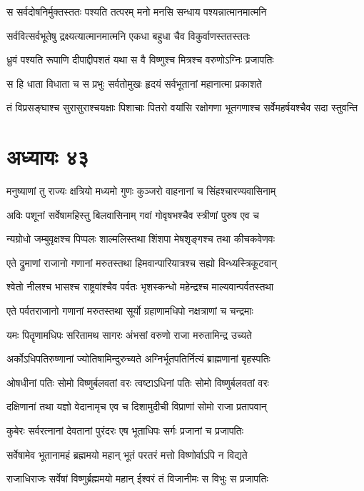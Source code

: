 \twolineshloka
{स सर्वदोषनिर्मुक्तस्ततः पश्यति तत्परम्}
{मनो मनसि सन्धाय पश्यन्नात्मानमात्मनि}


\twolineshloka
{सर्ववित्सर्वभूतेषु द्रक्ष्यत्यात्मानमात्मनि}
{एकधा बहुधा चैव विकुर्वाणस्ततस्ततः}


\twolineshloka
{ध्रुवं पश्यति रूपाणि दीपाद्दीपशतं यथा}
{स वै विष्णुश्च मित्रश्च वरुणोऽग्निः प्रजापतिः}


\twolineshloka
{स हि धाता विधाता च स प्रभुः सर्वतोमुखः}
{हृदयं सर्वभूतानां महानात्मा प्रकाशते}


\twolineshloka
{तं विप्रसङ्घाश्च सुरासुराश्चयक्षाः पिशाचाः पितरो वयांसि}
{रक्षोगणा भूतगणाश्च सर्वेमहर्षयश्चैव सदा स्तुवन्ति}


\chapter{अध्यायः ४३}
\twolineshloka
{मनुष्याणां तु राज्यः क्षत्रियो मध्यमो गुणः}
{कुञ्जरो वाहनानां च सिंहश्चारण्यवासिनाम्}


\twolineshloka
{अविः पशूनां सर्वेषामहिस्तु बिलवासिनाम्}
{गवां गोवृषभश्चैव स्त्रीणां पुरुष एव च}


\twolineshloka
{न्यग्रोधो जम्बुवृक्षश्च पिप्पलः शाल्मलिस्तथा}
{शिंशपा मेषशृङ्गश्च तथा कीचकवेणवः}


\twolineshloka
{एते द्रुमाणां राजानो गणानां मरुतस्तथा}
{हिमवान्पारियात्रश्च सह्यो विन्ध्यस्त्रिकूटवान्}


\twolineshloka
{श्वेतो नीलश्च भासश्च राष्ट्रवांश्चैव पर्वतः}
{भृशस्कन्धो महेन्द्रश्च माल्यवान्पर्वतस्तथा}


\twolineshloka
{एते पर्वतराजानो गणानां मरुतस्तथा}
{सूर्यो ग्रहाणामधिपो नक्षत्राणां च चन्द्रमाः}


\twolineshloka
{यमः पितॄणामधिपः सरितामथ सागरः}
{अंभसां वरुणो राजा मरुतामिन्द्र उच्यते}


\twolineshloka
{अर्कोऽधिपतिरुष्णानां ज्योतिषामिन्दुरुच्यते}
{अग्निर्भूतपतिर्नित्यं ब्राह्मणानां बृहस्पतिः}


\threelineshloka
{ओषधीनां पतिः सोमो विष्णुर्बलवतां वरः}
{त्वष्टाऽधिनां पतिः सोमो विष्णुर्बलवतां वरः}
{}


\twolineshloka
{दक्षिणानां तथा यज्ञो वेदानामृच एव च}
{दिशामुदीची विप्राणां सोमो राजा प्रतापवान्}


\twolineshloka
{कुबेरः सर्वरत्नानां देवतानां पुरंदरः}
{एष भूताधिपः सर्गः प्रजानां च प्रजापतिः}


\twolineshloka
{सर्वेषामेव भूतानामहं ब्रह्ममयो महान्}
{भूतं परतरं मत्तो विष्णोर्वाऽपि न विद्यते}


\twolineshloka
{राजाधिराजः सर्वेषां विष्णुर्ब्रह्ममयो महान्}
{ईश्वरं तं विजानीमः स विभुः स प्रजापतिः}


